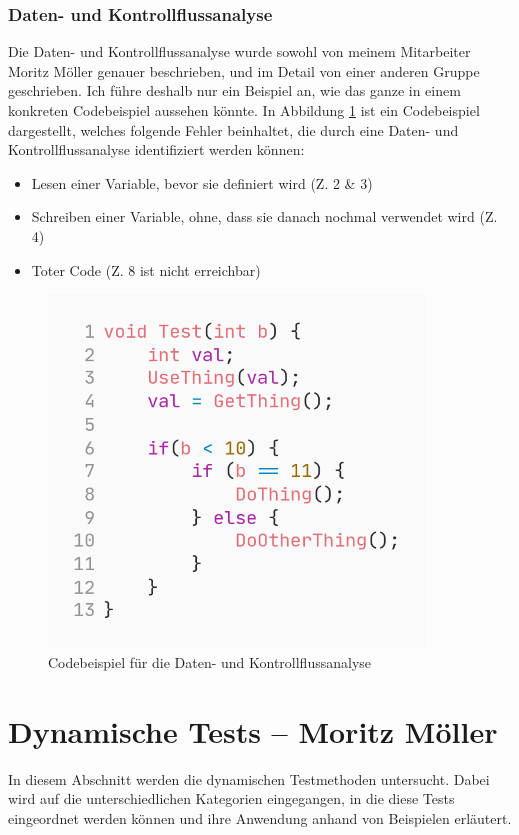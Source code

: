 \documentclass[	%
		fontsize=11pt,  %
		a4paper,	    %
		ngerman,		%
		sans,			%
		f4,				%
	]{HsH-report}		%
\begin{document}
\subsection{Daten- und Kontrollflussanalyse}

Die Daten- und Kontrollflussanalyse wurde sowohl von meinem Mitarbeiter Moritz
Möller genauer beschrieben, und im Detail von einer anderen Gruppe geschrieben.
Ich führe deshalb nur ein Beispiel an, wie das ganze in einem konkreten
Codebeispiel aussehen könnte. In Abbildung \ref{fig:datenfluss} ist ein
Codebeispiel dargestellt, welches folgende Fehler beinhaltet, die durch eine
Daten- und Kontrollflussanalyse identifiziert werden können:

\begin{itemize}
	\item Lesen einer Variable, bevor sie definiert wird (Z. 2 \& 3)
	\item Schreiben einer Variable, ohne, dass sie danach nochmal verwendet wird (Z. 4)
	\item Toter Code (Z. 8 ist nicht erreichbar)
\end{itemize}

\begin{figure}
	\centering
	\includegraphics[width=10cm]{code_example.png}
	\caption{Codebeispiel für die Daten- und Kontrollflussanalyse} \label{fig:datenfluss}
\end{figure}

\chapter{Dynamische Tests -- Moritz Möller} \label{chap: dynamic}
In diesem Abschnitt werden die dynamischen Testmethoden untersucht. Dabei wird
auf die unterschiedlichen Kategorien eingegangen, in die diese Tests
eingeordnet werden können und ihre Anwendung anhand von Beispielen erläutert.
\end{document}
